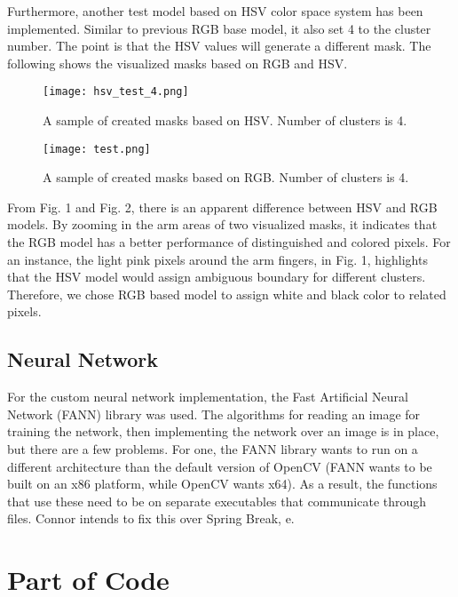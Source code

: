 \documentclass[10pt,journal,compsoc, draftclsnofoot,onecolumn]{IEEEtran}
\begin{document}
\noindent Furthermore, another test model based on HSV color space system has been implemented. Similar to previous RGB base model, it also set 4 to the cluster number. The point is that the HSV values will generate a different mask. The following shows the visualized masks based on RGB and HSV.

\begin{figure}[H]
  \begin{center}
    \texttt{[image: hsv\_test\_4.png]}
  \end{center}
  \caption{A sample of created masks based on HSV. Number of clusters is 4.}
\end{figure}

\begin{figure}[H]
  \begin{center}
    \texttt{[image: test.png]}
  \end{center}
  \caption{A sample of created masks based on RGB. Number of clusters is 4.}
\end{figure}

\noindent From Fig. 1 and Fig. 2, there is an apparent difference between HSV and RGB models. By zooming in the arm areas of two visualized masks, it indicates that the RGB model has a better performance of distinguished and colored pixels. For an instance, the light pink pixels around the arm fingers, in Fig. 1, highlights that the HSV model would assign ambiguous boundary for different clusters. Therefore, we chose RGB based model to assign white and black color to related pixels. 

\subsection{Neural Network}
For the custom neural network implementation, the Fast Artificial Neural Network (FANN) library was used. The algorithms for reading an image for training the network, then implementing the network over an image is in place, but there are a few problems. For one, the FANN library wants to run on a different architecture than the default version of OpenCV (FANN wants to be built on an x86 platform, while OpenCV wants x64). As a result, the functions that use these need to be on separate executables that communicate through files. Connor intends to fix this over Spring Break, e.  

\section{Part of Code}
\end{document}
